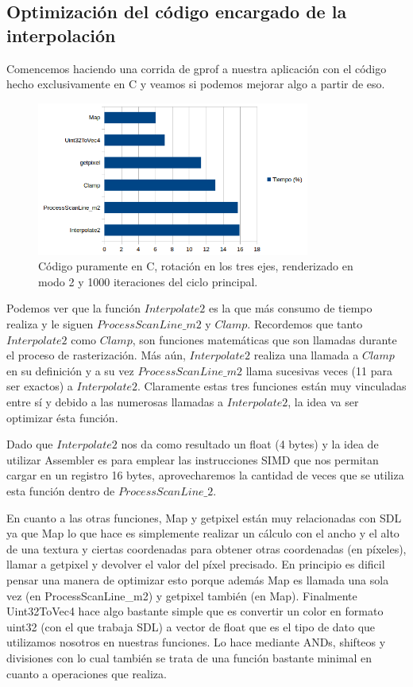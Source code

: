 \documentclass[a4paper]{article}
\newcounter{col}
\begin{document}
\subsection{Optimización del código encargado de la interpolación}
Comencemos haciendo una corrida de gprof a nuestra aplicación con el código hecho exclusivamente en C y veamos si podemos mejorar algo a partir de eso. 

\begin{figure}[h]
    \centering
    \includegraphics[width=0.8\textwidth]{Imagenes/gprof1.png}
    \caption{Código puramente en C, rotación en los tres ejes, renderizado en modo 2 y 1000 iteraciones del ciclo principal.}
    \label{fig:mesh1}
\end{figure}


Podemos ver que la función $Interpolate2$ es la que más consumo de tiempo realiza y le siguen $ProcessScanLine\_m2$ y $Clamp$. Recordemos que tanto $Interpolate2$ como $Clamp$, son funciones matemáticas que son llamadas durante el proceso de rasterización. Más aún, $Interpolate2$ realiza una llamada a $Clamp$ en su definición y a su vez $ProcessScanLine\_m2$ llama sucesivas veces (11 para ser exactos) a $Interpolate2$. Claramente estas tres funciones están muy vinculadas entre sí y debido a las numerosas llamadas a $Interpolate2$, la idea va ser optimizar ésta función.
\par Dado que $Interpolate2$ nos da como resultado un float (4 bytes) y la idea de utilizar Assembler es para emplear las instrucciones SIMD que nos permitan cargar en un registro 16 bytes, aprovecharemos la cantidad de veces que se utiliza esta función dentro de $ProcessScanLine\_2$.

En cuanto a las otras funciones, Map y getpixel están muy relacionadas con SDL ya que Map lo que hace es simplemente realizar un cálculo con el ancho y el alto de una textura y ciertas coordenadas para obtener otras coordenadas (en píxeles), llamar a getpixel y devolver el valor del píxel precisado. En principio es dificil pensar una manera de optimizar esto porque además Map es llamada una sola vez (en ProcessScanLine_m2) y getpixel también (en Map). Finalmente Uint32ToVec4 hace algo bastante simple que es convertir un color en formato uint32 (con el que trabaja SDL) a vector de float que es el tipo de dato que utilizamos nosotros en nuestras funciones. Lo hace mediante ANDs, shifteos y divisiones con lo cual también se trata de una función bastante minimal en cuanto a operaciones que realiza.
\end{document}

